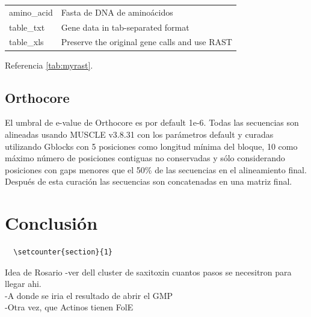 \documentclass[12pt,twoside]{reedthesis}
\begin{document}
\begin{longtable}[]{@{}ll@{}}
  \begin{minipage}[t]{0.22\columnwidth}\raggedright\strut
  amino\_acid\strut
  \end{minipage} & \begin{minipage}[t]{0.72\columnwidth}\raggedright\strut
  Fasta de DNA de aminoácidos\strut
  \end{minipage}\tabularnewline
  \begin{minipage}[t]{0.22\columnwidth}\raggedright\strut
  table\_txt\strut
  \end{minipage} & \begin{minipage}[t]{0.72\columnwidth}\raggedright\strut
  Gene data in tab-separated format\strut
  \end{minipage}\tabularnewline
  \begin{minipage}[t]{0.22\columnwidth}\raggedright\strut
  table\_xls\strut
  \end{minipage} & \begin{minipage}[t]{0.72\columnwidth}\raggedright\strut
  Preserve the original gene calls and use RAST\strut
  \end{minipage}\tabularnewline
  \bottomrule
  \end{longtable}
  
  Referencia \autoref{tab:myrast}.
  
  \section{Orthocore}\label{orthocore}
  
  El umbral de e-value de Orthocore es por default 1e-6. Todas las
  secuencias son alineadas usando MUSCLE v3.8.31 con los parámetros
  default y curadas utilizando Gblocks con 5 posiciones como longitud
  mínima del bloque, 10 como máximo número de posiciones contiguas no
  conservadas y sólo considerando posiciones con gaps menores que el 50\%
  de las secuencias en el alineamiento final. Después de esta curación las
  secuencias son concatenadas en una matriz final.
  
  \chapter{Conclusión}\label{conclusion}
  
  \begin{verbatim}
  \setcounter{section}{1}
  \end{verbatim}
  
  Idea de Rosario -ver dell cluster de saxitoxin cuantos pasos se
  necesitron para llegar ahi.\\
  -A donde se iria el resultado de abrir el GMP\\
  -Otra vez, que Actinos tienen FolE
  
\end{document}
